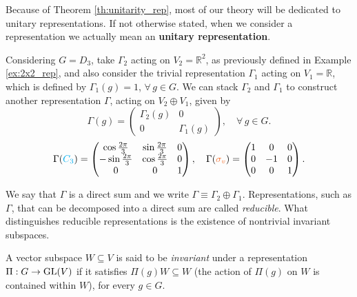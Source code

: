 Because of Theorem \ref{th:unitarity_rep}, most of our theory will be dedicated to unitary representations. If not otherwise stated, when we consider a representation we actually mean an \textbf{unitary representation}.

\begin{example} \label{ex:direct_sum}
Considering $G = D_3$, take $\Gamma_2$ acting on $V_2 = \mathbb{R}^2$, as previously defined in Example \ref{ex:2x2_rep}, and also consider the trivial representation $\Gamma_1$ acting on $V_1 = \mathbb{R}$, which is defined by $\Gamma_1(g) = 1$, $\forall \, g \in G$. We can stack $\Gamma_2$ and $\Gamma_1$ to construct another representation $\Gamma$, acting on $V_2 \oplus V_1$, given by
\begin{equation} \label{eq:block_diagonal_Gamma_2_1}
\Gamma(g) =
\begin{pmatrix}
\Gamma_2(g) & 0 \\
0 & \Gamma_1(g)
\end{pmatrix}, \quad \forall \, g \in G.
\end{equation}
\begin{equation} \label{eq:D6_generators_3x3matrices}
\Gamma(\Ct) =
\begin{pmatrix}
\cos{\frac{2\pi}{3}} & \sin{\frac{2\pi}{3}} & 0 \\
-\sin{\frac{2\pi}{3}} & \cos{\frac{2\pi}{3}} & 0 \\
0 & 0 & 1
\end{pmatrix},
\quad
\Gamma(\sv) =
\begin{pmatrix}
1 & 0 & 0 \\
0 & -1 & 0 \\
0 & 0 & 1
\end{pmatrix}.
\end{equation}

We say that $\Gamma$ is a direct sum and we write $\Gamma \equiv \Gamma_2 \oplus \Gamma_1$. Representations, such as $\Gamma$, that can be decomposed into a direct sum are called \textit{reducible}. What distinguishes reducible representations is the existence of nontrivial invariant subspaces.
\end{example}

\begin{definition} \label{def:invariant_subspace}
A vector subspace $W \subseteq V$ is said to be \textit{invariant} under a representation $\Pi: G \to {\text{GL}}(V)$ if it satisfies $\Pi(g) W \subseteq W$ (the action of $\Pi(g)$ on $W$ is contained within $W$), for every $g \in G$.
\end{definition}

